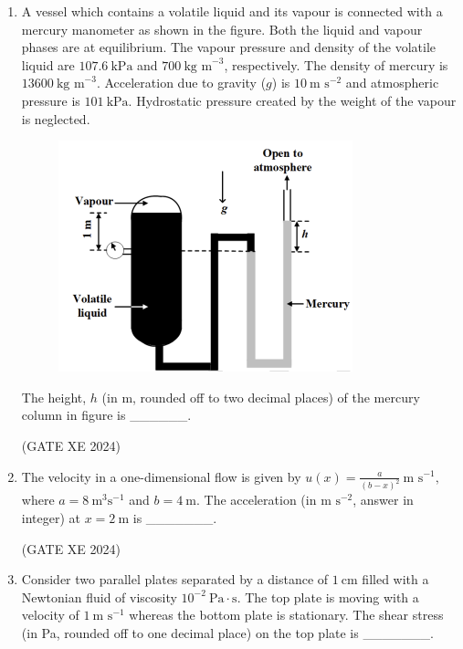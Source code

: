 \documentclass[12pt]{article}
\begin{document}
\begin{enumerate}
The directions of drag force and lift force, respectively are along
\begin{enumerate}
\item OA and OC.
\item OA and OD.
\item OB and OC.
\item OB and OD.
\end{enumerate}

(GATE XE 2024)

\item A vessel which contains a volatile liquid and its vapour is connected with a mercury manometer as shown in the figure. Both the liquid and vapour phases are at equilibrium. The vapour pressure and density of the volatile liquid are $107.6\ \text{kPa}$ and $700\ \text{kg m}^{-3}$, respectively. The density of mercury is $13600\ \text{kg m}^{-3}$. Acceleration due to gravity ($g$) is $10\ \text{m s}^{-2}$ and atmospheric pressure is $101\ \text{kPa}$. Hydrostatic pressure created by the weight of the vapour is neglected.

\begin{figure}[H]
    \centering
    \includegraphics[width=0.5\columnwidth]{figs/ass5_b_q35.png}
    \caption{}
    \label{fig:placeholder}
\end{figure}
The height, $h$ (in m, rounded off to two decimal places) of the mercury column in figure is \_\_\_\_\_\_. 

(GATE XE 2024)

\item The velocity in a one-dimensional flow is given by
$
u(x)=\frac{a}{(b-x)^2}\ \text{m s}^{-1},
$
where $a=8\ \text{m}^3\text{s}^{-1}$ and $b=4\ \text{m}$. The acceleration (in $\text{m s}^{-2}$, answer in integer) at $x=2\ \text{m}$ is \_\_\_\_\_\_\_. 

(GATE XE 2024)

\item Consider two parallel plates separated by a distance of $1\ \text{cm}$ filled with a Newtonian fluid of viscosity $10^{-2}\ \text{Pa}\cdot\text{s}$. The top plate is moving with a velocity of $1\ \text{m s}^{-1}$ whereas the bottom plate is stationary. The shear stress (in Pa, rounded off to one decimal place) on the top plate is \_\_\_\_\_\_\_.


\end{enumerate}
\end{document}
